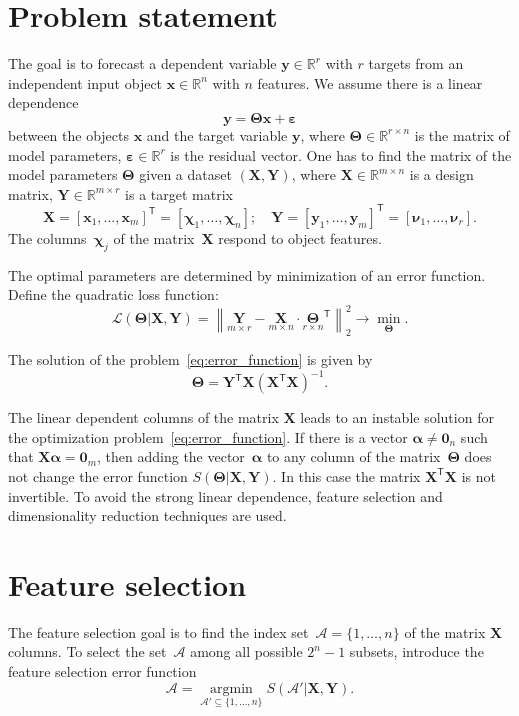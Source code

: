 \documentclass[12pt,twoside]{article}
\theoremstyle{definition}
\newcommand{\bx}{\mathbf{x}}
\newcommand{\by}{\mathbf{y}}
\newcommand{\bY}{\mathbf{Y}}
\newcommand{\bX}{\mathbf{X}}
\newcommand{\bbR}{\mathbb{R}}
\newcommand{\cA}{\mathcal{A}}
\newcommand{\T}{\mathsf{T}}
\newcommand{\bchi}{\boldsymbol{\chi}}
\newcommand{\bnu}{\boldsymbol{\nu}}
\newcommand{\bTheta}{\boldsymbol{\Theta}}
\newcommand{\bZero}{\boldsymbol{0}}
\newcommand{\argmin}{\mathop{\arg \min}\limits}
\begin{document}
\section{Problem statement}
The goal is to forecast a dependent variable $\by \in \bbR^r$ with $r$ targets from an independent input object $\bx \in \bbR^n$ with $n$ features.
We assume there is a linear dependence
\begin{equation}
	\by = \bTheta \bx+ \boldsymbol{\varepsilon}
	\label{eq:model}
\end{equation}
between the objects $\bx$ and the target variable $\by$,
where $\bTheta \in \bbR^{r \times n}$ is the matrix of model parameters, $\boldsymbol{\varepsilon} \in \bbR^{r}$ is the residual vector.
One has to find the matrix of the model parameters $\bTheta$ given a dataset $\left( \bX, \bY \right)$, where $\bX \in \bbR^{m \times n}$ is a design matrix, $\bY \in \bbR^{m \times r}$ is a target matrix
\[
	\bX = [\bx_1, \dots, \bx_m]^{\T} =  [\bchi_1, \dots, \bchi_n]; \quad \bY = [\by_1, \dots, \by_m]^{\T} =  [\bnu_1, \dots, \bnu_r].
\]
The columns~$\bchi_j$ of the matrix~$\bX$ respond to object features.

The optimal parameters are determined by minimization of an error function.
Define the quadratic loss function:
\begin{equation}
	\mathcal{L}(\bTheta | \bX, \bY) = {\left\| \underset{m \times r}{\mathbf{Y}}  - \underset{m \times n}{\bX} \cdot \underset{r \times n}{\bTheta}^{\T} \right\| }_2^2 \rightarrow\min_{\bTheta}.
\label{eq:error_function}
\end{equation}

 The solution of the problem~\eqref{eq:error_function} is given by
 \[
 	\bTheta = \bY^{\T} \bX (\bX^{\T} \bX)^{-1}.
 \]

 The linear dependent columns of the matrix $\bX$ leads to an instable solution for the optimization problem~\eqref{eq:error_function}.
 If there is a vector $\boldsymbol{\alpha} \neq \bZero_n$ such that $\bX \boldsymbol{\alpha}= \bZero_m$, then adding the vector~$\boldsymbol{\alpha}$ to any column of the matrix~$\bTheta$ does not change the error function $S(\bTheta | \bX, \bY)$.
 In this case the matrix $\bX^{\T} \bX$ is not invertible.
 To avoid the strong linear dependence, feature selection and dimensionality reduction techniques are used.

 \section{Feature selection}
 The feature selection goal is to find the index set~$\cA = \{1, \dots, n\}$ of the matrix $\bX$ columns. To select the set~$\cA$ among all possible $2^n - 1$ subsets, introduce the feature selection error function
\begin{equation}
	\cA = \argmin_{\cA' \subseteq \{1, \dots, n\}} S(\cA' | \bX, \bY).
	\label{eq:subset_selection}
\end{equation}
\end{document}
